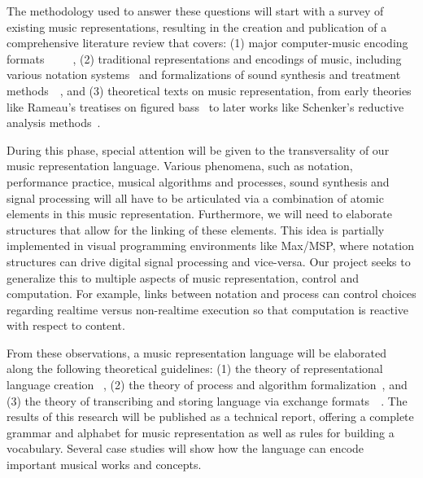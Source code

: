 \documentclass{article}
\begin{document}
The methodology used to answer these questions will start with a survey of
existing music representations, resulting in the creation and publication of
a comprehensive literature review that covers: (1) major computer-music
encoding
formats~\cite{hoos98}~\cite{lilypond06}~\cite{good2001musicxml}~\cite{alvaro2010musicjson}~\cite{roland2002music},
(2) traditional representations and encodings of music,
including various notation systems~\cite{hultberg2000printed} and formalizations
of sound synthesis and treatment
methods~\cite{mason1953feedback}~\cite{foote1999visualizing},
and (3) theoretical texts on music representation, from
early theories like Rameau's treatises on figured bass~\cite{rameau:1722} to later works
like Schenker’s reductive analysis methods~\cite{schenker:1935}.

During this phase, special attention will be given to the transversality of
our music representation language.  Various phenomena, such as notation,
performance practice, musical algorithms and processes, sound synthesis and
signal processing will all have to be articulated via a combination of
atomic elements in this music representation.  Furthermore, we will need to
elaborate structures that allow for the linking of these elements.
This idea is partially implemented in visual programming environments like Max/MSP, where notation
structures can drive digital signal processing and vice-versa. Our project
seeks to generalize this to multiple aspects of music representation, control and
computation. For example, links between notation and process can control choices regarding
real\-time versus non-real\-time execution so that computation is reactive with
respect to content.

From these observations, a music representation language will be elaborated
along the following theoretical guidelines: (1) the theory of
representational language creation \cite{wagner2002design}~\cite{shieber1984design},
(2) the theory of process and algorithm
formalization~\cite{salwicki1970formalized}, and
(3) the theory of transcribing and storing language via exchange
formats~\cite{qiu1999programming}~\cite{gruber1993translation}. The
results of this research will be published as a technical report, offering a
complete grammar and alphabet for music representation as well as rules for
building a vocabulary. Several case studies will show how the language can
encode important musical works and concepts.
\end{document}
